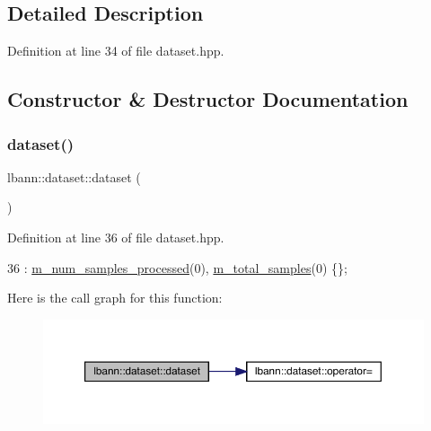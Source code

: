 \subsection{Detailed Description}


Definition at line 34 of file dataset.\+hpp.



\subsection{Constructor \& Destructor Documentation}
\mbox{\label{classlbann_1_1dataset_ab2d74c40559624136c98b1e36193fbe3}} 
\subsubsection{\texorpdfstring{dataset()}{dataset()}\hspace{0.1cm}{\footnotesize\ttfamily [1/2]}}
{\footnotesize\ttfamily lbann\+::dataset\+::dataset (\begin{DoxyParamCaption}{ }\end{DoxyParamCaption})\hspace{0.3cm}{\ttfamily [inline]}}



Definition at line 36 of file dataset.\+hpp.


\begin{DoxyCode}
36 : \hyperlink{classlbann_1_1dataset_a68f4120cc4a7837e6a95b01358210cb5}{m\_num\_samples\_processed}(0), \hyperlink{classlbann_1_1dataset_a2bfe72a2783e0a47e725e91dfb13d06a}{m\_total\_samples}(0) \{\};
\end{DoxyCode}
Here is the call graph for this function\+:\nopagebreak
\begin{figure}[H]
\begin{center}
\leavevmode
\includegraphics[width=350pt]{classlbann_1_1dataset_ab2d74c40559624136c98b1e36193fbe3_cgraph}
\end{center}
\end{figure}
\mbox{\label{classlbann_1_1dataset_a505f3c75563db4728949ff6cdd328723}} 

